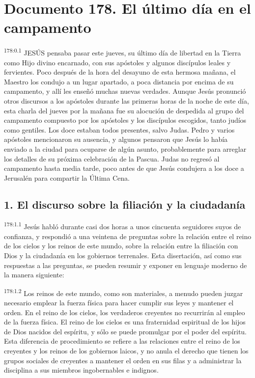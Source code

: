 \chapter{Documento 178. El último día en el campamento}
\par 
\textsuperscript{178:0.1} JESÚS pensaba pasar este jueves, su último día de libertad en la Tierra como Hijo divino encarnado, con sus apóstoles y algunos discípulos leales y fervientes. Poco después de la hora del desayuno de esta hermosa mañana, el Maestro los condujo a un lugar apartado, a poca distancia por encima de su campamento, y allí les enseñó muchas nuevas verdades. Aunque Jesús pronunció otros discursos a los apóstoles durante las primeras horas de la noche de este día, esta charla del jueves por la mañana fue su alocución de despedida al grupo del campamento compuesto por los apóstoles y los discípulos escogidos, tanto judíos como gentiles. Los doce estaban todos presentes, salvo Judas. Pedro y varios apóstoles mencionaron su ausencia, y algunos pensaron que Jesús lo había enviado a la ciudad para ocuparse de algún asunto, probablemente para arreglar los detalles de su próxima celebración de la Pascua. Judas no regresó al campamento hasta media tarde, poco antes de que Jesús condujera a los doce a Jerusalén para compartir la Última Cena.

\section*{1. El discurso sobre la filiación y la ciudadanía}
\par 
\textsuperscript{178:1.1} Jesús habló durante casi dos horas a unos cincuenta seguidores suyos de confianza, y respondió a una veintena de preguntas sobre la relación entre el reino de los cielos y los reinos de este mundo, sobre la relación entre la filiación con Dios y la ciudadanía en los gobiernos terrenales. Esta disertación, así como sus respuestas a las preguntas, se pueden resumir y exponer en lenguaje moderno de la manera siguiente:

\par 
\textsuperscript{178:1.2} Los reinos de este mundo, como son materiales, a menudo pueden juzgar necesario emplear la fuerza física para hacer cumplir sus leyes y mantener el orden. En el reino de los cielos, los verdaderos creyentes no recurrirán al empleo de la fuerza física. El reino de los cielos es una fraternidad espiritual de los hijos de Dios nacidos del espíritu, y sólo se puede promulgar por el poder del espíritu. Esta diferencia de procedimiento se refiere a las relaciones entre el reino de los creyentes y los reinos de los gobiernos laicos, y no anula el derecho que tienen los grupos sociales de creyentes a mantener el orden en sus filas y a administrar la disciplina a sus miembros ingobernables e indignos.

